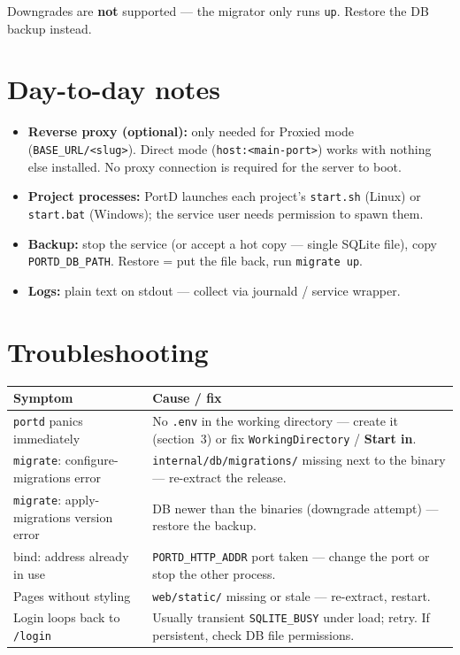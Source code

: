 \documentclass[11pt,a4paper]{article}
\newcommand{\chemin}[1]{\texttt{#1}}
\begin{document}
Downgrades are \textbf{not} supported — the migrator only runs \chemin{up}. Restore the DB backup instead.

\section{Day-to-day notes}

\begin{itemize}[leftmargin=*]
  \item \textbf{Reverse proxy (optional):} only needed for Proxied mode (\chemin{BASE\_URL/<slug>}). Direct mode (\chemin{host:<main-port>}) works with nothing else installed. No proxy connection is required for the server to boot.
  \item \textbf{Project processes:} PortD launches each project's \chemin{start.sh} (Linux) or \chemin{start.bat} (Windows); the service user needs permission to spawn them.
  \item \textbf{Backup:} stop the service (or accept a hot copy — single SQLite file), copy \chemin{PORTD\_DB\_PATH}. Restore = put the file back, run \chemin{migrate up}.
  \item \textbf{Logs:} plain text on stdout — collect via journald / service wrapper.
\end{itemize}

\section{Troubleshooting}

\begin{center}
\begin{longtable}{p{4.2cm}p{10cm}}
  \hline
  \textbf{Symptom} & \textbf{Cause / fix} \\ \hline
  \chemin{portd} panics immediately & No \chemin{.env} in the working directory — create it (section~3) or fix \chemin{WorkingDirectory} / \textbf{Start in}. \\ \hline
  \chemin{migrate}: configure-migrations error & \chemin{internal/db/migrations/} missing next to the binary — re-extract the release. \\ \hline
  \chemin{migrate}: apply-migrations version error & DB newer than the binaries (downgrade attempt) — restore the backup. \\ \hline
  bind: address already in use & \chemin{PORTD\_HTTP\_ADDR} port taken — change the port or stop the other process. \\ \hline
  Pages without styling & \chemin{web/static/} missing or stale — re-extract, restart. \\ \hline
  Login loops back to \chemin{/login} & Usually transient \chemin{SQLITE\_BUSY} under load; retry. If persistent, check DB file permissions. \\ \hline
\end{longtable}
\end{center}
\end{document}
